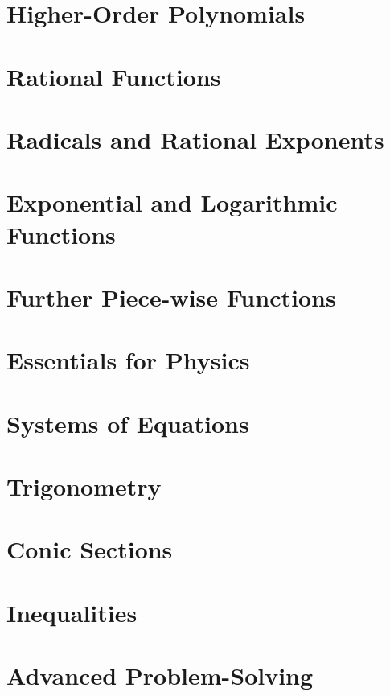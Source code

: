 \documentclass[lang=en,11pt]{elegantbook}
\begin{document}
\chapter{Higher-Order Polynomials}

\chapter{Rational Functions}

\chapter{Radicals and Rational Exponents}

\chapter{Exponential and Logarithmic Functions}

\chapter{Further Piece-wise Functions}

\chapter{Essentials for Physics}

\chapter{Systems of Equations}

\chapter{Trigonometry}

\chapter{Conic Sections}

\chapter{Inequalities}

\chapter{Advanced Problem-Solving}
\end{document}
